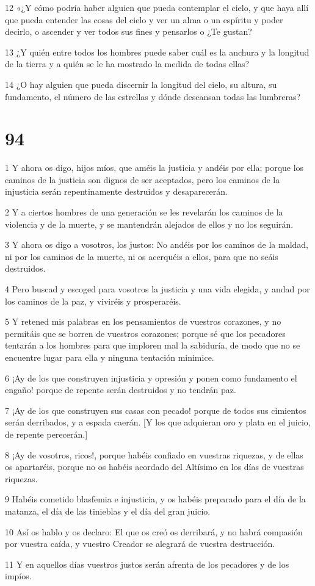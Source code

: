 \par 12 «¿Y cómo podría haber alguien que pueda contemplar el cielo, y que haya allí que pueda entender las cosas del cielo y ver un alma o un espíritu y poder decirlo, o ascender y ver todos sus fines y pensarlos o ¿Te gustan?
\par 13 ¿Y quién entre todos los hombres puede saber cuál es la anchura y la longitud de la tierra y a quién se le ha mostrado la medida de todas ellas?
\par 14 ¿O hay alguien que pueda discernir la longitud del cielo, su altura, su fundamento, el número de las estrellas y dónde descansan todas las lumbreras?



\chapter{94}

\par 1 Y ahora os digo, hijos míos, que améis la justicia y andéis por ella; porque los caminos de la justicia son dignos de ser aceptados, pero los caminos de la injusticia serán repentinamente destruidos y desaparecerán.
\par 2 Y a ciertos hombres de una generación se les revelarán los caminos de la violencia y de la muerte, y se mantendrán alejados de ellos y no los seguirán.
\par 3 Y ahora os digo a vosotros, los justos: No andéis por los caminos de la maldad, ni por los caminos de la muerte, ni os acerquéis a ellos, para que no seáis destruidos.
\par 4 Pero buscad y escoged para vosotros la justicia y una vida elegida, y andad por los caminos de la paz, y viviréis y prosperaréis.
\par 5 Y retened mis palabras en los pensamientos de vuestros corazones, y no permitáis que se borren de vuestros corazones; porque sé que los pecadores tentarán a los hombres para que imploren mal la sabiduría, de modo que no se encuentre lugar para ella y ninguna tentación minimice.
\par 6 ¡Ay de los que construyen injusticia y opresión y ponen como fundamento el engaño! porque de repente serán destruidos y no tendrán paz.
\par 7 ¡Ay de los que construyen sus casas con pecado! porque de todos sus cimientos serán derribados, y a espada caerán. [Y los que adquieran oro y plata en el juicio, de repente perecerán.]
\par 8 ¡Ay de vosotros, ricos!, porque habéis confiado en vuestras riquezas, y de ellas os apartaréis, porque no os habéis acordado del Altísimo en los días de vuestras riquezas.
\par 9 Habéis cometido blasfemia e injusticia, y os habéis preparado para el día de la matanza, el día de las tinieblas y el día del gran juicio.
\par 10 Así os hablo y os declaro: El que os creó os derribará, y no habrá compasión por vuestra caída, y vuestro Creador se alegrará de vuestra destrucción.
\par 11 Y en aquellos días vuestros justos serán afrenta de los pecadores y de los impíos.

